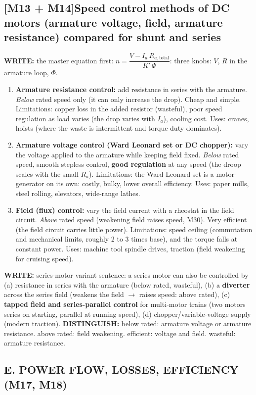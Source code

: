 \documentclass[11pt]{article}
\newcommand{\q}[2]{\subsection*{\color{copper}#1\quad\color{iron}#2}}
\newcommand{\w}[1]{\textbf{\color{copper}WRITE:} #1}
\newcommand{\kd}[1]{\textbf{\color{red}DISTINGUISH:} #1}
\begin{document}
\q{[M13 + M14]}{Speed control methods of DC motors (armature voltage, field, armature resistance) compared for shunt and series}
\w{the master equation first: $n = \dfrac{V - I_a\, R_{a,\text{total}}}{K'\, \Phi}$: three knobs: $V$, $R$ in the armature loop, $\Phi$.}
\begin{enumerate}[label=\arabic*.]
\item \textbf{Armature resistance control:} add resistance in series with the armature. \emph{Below} rated speed only (it can only increase the drop). Cheap and simple. Limitations: copper loss in the added resistor (wasteful), poor speed regulation as load varies (the drop varies with $I_a$), cooling cost. Uses: cranes, hoists (where the waste is intermittent and torque duty dominates).
\item \textbf{Armature voltage control (Ward Leonard set or DC chopper):} vary the voltage applied to the armature while keeping field fixed. \emph{Below} rated speed, smooth stepless control, \textbf{good regulation} at any speed (the droop scales with the small $R_a$). Limitations: the Ward Leonard set is a motor-generator on its own: costly, bulky, lower overall efficiency. Uses: paper mills, steel rolling, elevators, wide-range lathes.
\item \textbf{Field (flux) control:} vary the field current with a rheostat in the field circuit. \emph{Above} rated speed (weakening field raises speed, M30). Very efficient (the field circuit carries little power). Limitations: speed ceiling (commutation and mechanical limits, roughly 2 to 3 times base), and the torque falls at constant power. Uses: machine tool spindle drives, traction (field weakening for cruising speed).
\end{enumerate}
\w{series-motor variant sentence:} a series motor can also be controlled by (a) resistance in series with the armature (below rated, wasteful), (b) a \textbf{diverter} across the series field (weakens the field $\rightarrow$ raises speed: above rated), (c) \textbf{tapped field and series-parallel control} for multi-motor trains (two motors series on starting, parallel at running speed), (d) chopper/variable-voltage supply (modern traction).
\kd{below rated: armature voltage or armature resistance. above rated: field weakening. efficient: voltage and field. wasteful: armature resistance.}

\hrulefill
\subsection*{\color{copper}E. POWER FLOW, LOSSES, EFFICIENCY (M17, M18)}
\end{document}
